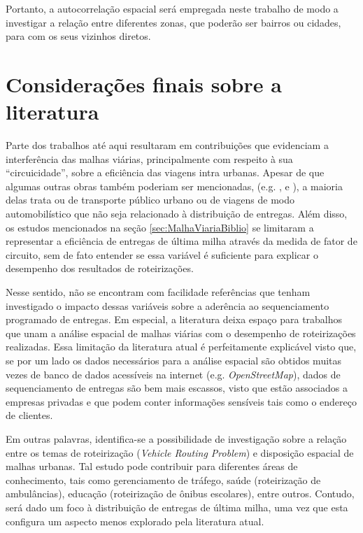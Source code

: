 Portanto, a autocorrelação espacial será empregada neste trabalho de modo a investigar a relação entre diferentes zonas, que poderão ser bairros ou cidades, para com os seus vizinhos diretos.

\section{Considerações finais sobre a literatura}

Parte dos trabalhos até aqui resultaram em contribuições que evidenciam a interferência das malhas viárias, principalmente com respeito à sua ``circuicidade'', sobre a eficiência das viagens intra urbanas.
Apesar de que algumas outras obras também poderiam ser mencionadas, (e.g. ,  e ), a maioria delas trata ou de transporte público urbano ou de viagens de modo automobilístico que não seja relacionado à distribuição de entregas.
%
Além disso, os estudos mencionados na seção \ref{sec:MalhaViariaBiblio} se limitaram a representar a eficiência de entregas de última milha através da medida de fator de circuito, sem de fato entender se essa variável é suficiente para explicar o desempenho dos resultados de roteirizações.

Nesse sentido, não se encontram com facilidade referências que tenham investigado o impacto dessas variáveis sobre a aderência ao sequenciamento programado de entregas. 
Em especial, a literatura deixa espaço para trabalhos que unam a análise espacial de malhas viárias com o desempenho de roteirizações realizadas.
Essa limitação da literatura atual é perfeitamente explicável visto que, se por um lado os dados necessários para a análise espacial são obtidos muitas vezes de banco de dados acessíveis na internet (e.g. \textit{OpenStreetMap}), dados de sequenciamento de entregas são bem mais escassos, visto que estão associados a empresas privadas e que podem conter informações sensíveis tais como o endereço de clientes. 

Em outras palavras, identifica-se a possibilidade de investigação sobre a relação entre os temas de roteirização (\textit{Vehicle Routing Problem}) e disposição espacial de malhas urbanas.
Tal estudo pode contribuir para diferentes áreas de conhecimento, tais como gerenciamento de tráfego, saúde (roteirização de ambulâncias), educação (roteirização de ônibus escolares), entre outros.
Contudo, será dado um foco à distribuição de entregas de última milha, uma vez que esta configura um aspecto menos explorado pela literatura atual.

